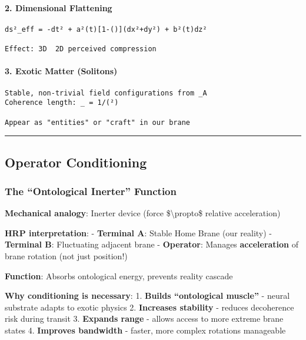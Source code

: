 \paragraph{2. Dimensional Flattening}\label{dimensional-flattening}

\begin{verbatim}
ds²_eff = -dt² + a²(t)[1-()](dx²+dy²) + b²(t)dz²

Effect: 3D  2D perceived compression
\end{verbatim}

\paragraph{3. Exotic Matter (Solitons)}\label{exotic-matter-solitons}

\begin{verbatim}
Stable, non-trivial field configurations from _A
Coherence length: _ = 1/(²)

Appear as "entities" or "craft" in our brane
\end{verbatim}

\begin{center}\rule{0.5\linewidth}{0.5pt}\end{center}

\subsection{Operator Conditioning}\label{operator-conditioning}

\subsubsection{The ``Ontological Inerter''
Function}\label{the-ontological-inerter-function}

\textbf{Mechanical analogy}: Inerter device (force
\$\textbackslash propto\$ relative acceleration)

\textbf{HRP interpretation}: - \textbf{Terminal A}: Stable Home Brane
(our reality) - \textbf{Terminal B}: Fluctuating adjacent brane -
\textbf{Operator}: Manages \textbf{acceleration} of brane rotation (not
just position!)

\textbf{Function}: Absorbs ontological energy, prevents reality cascade

\textbf{Why conditioning is necessary}: 1. \textbf{Builds ``ontological
muscle''} - neural substrate adapts to exotic physics 2.
\textbf{Increases stability} - reduces decoherence risk during transit
3. \textbf{Expands range} - allows access to more extreme brane states
4. \textbf{Improves bandwidth} - faster, more complex rotations
manageable

